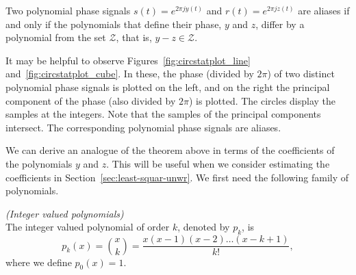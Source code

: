 \documentclass[journal]{IEEEtran}
\begin{document}
\begin{theorem}\label{thm:circpolysampledthm}
Two polynomial phase signals $s(t) = e^{2\pi j y(t)}$  and $r(t) = e^{2\pi j z(t)}$  are aliases if and only if the polynomials that define their phase, $y$ and $z$, differ by a polynomial from the set $\mathcal{Z}$, that is, $y - z \in \mathcal{Z}$.
\end{theorem}



It may be helpful to observe Figures~\ref{fig:circstatplot_line} and~\ref{fig:circstatplot_cube}.  In these, the phase (divided by $2\pi$) of two distinct polynomial phase signals is plotted on the left, and on the right the principal component of the phase (also divided by $2\pi$) is plotted. The circles display the samples at the integers. Note that the samples of the principal components intersect.  The corresponding polynomial phase signals are aliases.

We can derive an analogue of the theorem above in terms of the coefficients of the polynomials $y$ and $z$. This will be useful when we consider estimating the coefficients in Section~\ref{sec:least-squar-unwr}.  We first need the following family of polynomials. 

\begin{definition} \emph{(Integer valued polynomials)} \label{def:intvaledpolys}
\\The integer valued polynomial of order $k$, denoted by $p_k$, is
\[
p_k(x) = \binom{x}{k} = \frac{x(x-1)(x-2)\dots(x-k+1)}{k!},
\]
where we define $p_0(x) = 1$.
\end{definition}
\end{document}
